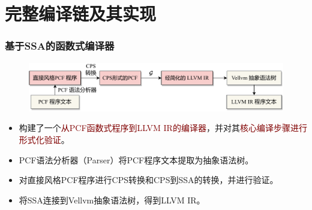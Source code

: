 
\section{完整编译链及其实现}

\begin{frame}
    \frametitle{基于SSA的函数式编译器}
    \begin{figure}
        \centering
        \includegraphics[width=0.9\linewidth]{figures/summary.drawio.pdf}
    \end{figure}
    \begin{itemize}
        \item 构建了一个\textcolor{Maroon}{从PCF函数式程序到LLVM IR的编译器}，并对其\textcolor{Maroon}{核心编译步骤进行形式化验证}。
        \item PCF语法分析器（Parser）将PCF程序文本提取为抽象语法树。
        \item 对直接风格PCF程序进行CPS转换和CPS到SSA的转换，并进行验证。
        \item 将SSA连接到Vellvm抽象语法树，得到LLVM IR。
    \end{itemize}
\end{frame}


